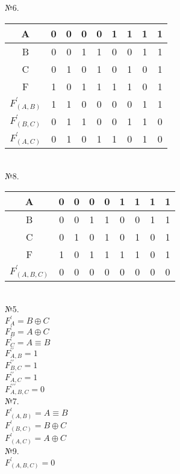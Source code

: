 \documentclass[a4paper,10pt]{report} %
\begin{document}
\begin{multicols}{2}
№6.\\
\bigskip
\begin{tabular}{|c|c|c|c|c|c|c|c|c|}
\hline
A &0 &0 &0 &0 &1 &1 &1 &1 \\
\hline
B &0 &0 &1 &1 &0 &0 &1 &1 \\
\hline
C &0 &1 &0 &1 &0 &1 &0 &1 \\
\hline
F  &1 & 0 & 1 & 1 & 1 & 1 & 0 & 1 \\
\hline
$F_{(A,B)}^{\prime}$ &1&1&0&0&0&0&1&1\\
\hline
$F_{(B,C)}^{\prime}$ &0&1&1&0&0&1&1&0\\
\hline
$F_{(A,C)}^{\prime}$ &0&1&0&1&1&0&1&0\\
\hline
\end{tabular}
\\
\bigskip
№8.\\
\bigskip
\begin{tabular}{|c|c|c|c|c|c|c|c|c|}
\hline
A &0 &0 &0 &0 &1 &1 &1 &1 \\
\hline
B &0 &0 &1 &1 &0 &0 &1 &1 \\
\hline
C &0 &1 &0 &1 &0 &1 &0 &1 \\
\hline
F &1 & 0 & 1 & 1 & 1 & 1 & 0 & 1 \\
\hline
$F_{(A,B,C)}^{\prime}$ &0&0&0&0&0&0&0&0\\
\hline
\end{tabular}\\
\bigskip
\columnbreak
№5. \\
\bigskip
$ F_A^{\prime} = B \oplus C $ \\
$ F_B^{\prime} = A \oplus C$ \\
$ F_C^{\prime} = A \equiv B $ \\
$ F_{A,B}^{\prime\prime} =  1$ \\
$ F_{B,C}^{\prime\prime} =  1$ \\
$ F_{A,C}^{\prime\prime} =  1$ \\
$ F_{A,B,C}^{\prime\prime\prime} = 0 $ \\
\bigskip
\bigskip
№7. \\
\bigskip
$ F_{(A,B)}^{\prime} = A \equiv B$ \\
$ F_{(B,C)}^{\prime} =  B \oplus C$ \\
$ F_{(A,C)}^{\prime} = A \oplus C$ \\
\bigskip
\bigskip
№9. \\
\bigskip
$ F_{(A,B,C)}^{\prime} = 0 $ \\
\end{multicols}
\end{document}
